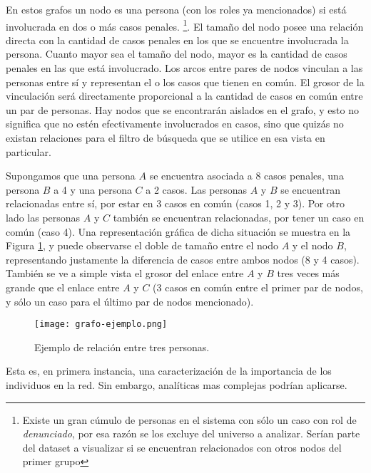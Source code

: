 En estos grafos un nodo es una persona (con los roles ya mencionados) si está involucrada en dos o más casos penales. \footnote{Existe un gran cúmulo de personas en el sistema con sólo un caso con rol de \textit{denunciado}, por esa razón se los excluye del universo a analizar. Serían parte del dataset a visualizar si se encuentran relacionados con otros nodos del primer grupo}. El tamaño del nodo posee una relación directa con la cantidad de casos penales en los que se encuentre involucrada la persona. Cuanto mayor sea el tamaño del nodo, mayor es la cantidad de casos penales en las que está involucrado.
Los arcos entre pares de nodos vinculan a las personas entre sí y representan el o los casos que tienen en común. El grosor de la vinculación será directamente proporcional a la cantidad de casos en común entre un par de personas. Hay nodos que se encontrarán aislados en el grafo, y esto no significa que no estén efectivamente involucrados en casos, sino que quizás no existan relaciones para el filtro de búsqueda que se utilice en esa vista en particular.

Supongamos que una persona $A$ se encuentra asociada a 8 casos penales, una persona $B$ a 4 y una persona $C$ a 2 casos. 
Las personas $A$ y $B$ se encuentran relacionadas entre sí, por estar en 3 casos en común (casos 1, 2 y 3). Por otro lado las personas $A$ y $C$ también se encuentran relacionadas, por tener un caso en común (caso 4).  Una representación gráfica de dicha situación se muestra en la Figura \ref{fig:grafode2}, y puede observarse el doble de tamaño entre el nodo $A$ y el nodo $B$, representando justamente la diferencia de casos entre ambos nodos (8 y 4 casos). También se ve a simple vista el grosor del enlace entre $A$ y $B$ tres veces más grande que el enlace entre $A$ y $C$ (3 casos en común entre el primer par de nodos, y sólo un caso para el último par de nodos mencionado). 


\begin{figure}
	\centering
	\texttt{[image: grafo-ejemplo.png]}
	\caption{Ejemplo de relación entre tres personas.} 
	\label{fig:grafode2}
\end{figure}

Esta es, en primera instancia, una caracterización de la importancia de los individuos en la red.
Sin embargo, analíticas mas complejas podrían aplicarse.